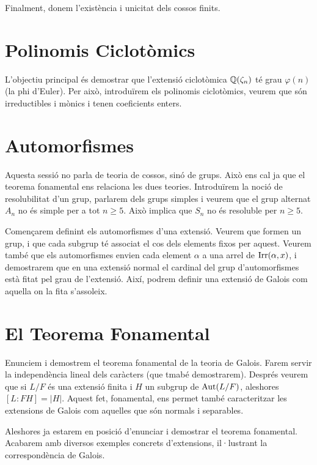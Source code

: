 \documentclass[
]{book}
\theoremstyle{definition}
\theoremstyle{definition}
\theoremstyle{definition}
\theoremstyle{definition}
\theoremstyle{remark}
\begin{document}
Finalment, donem l'existència i unicitat dels cossos finits.

\hypertarget{polinomis-ciclotuxf2mics}{%
\chapter{Polinomis Ciclotòmics}\label{polinomis-ciclotuxf2mics}}

L'objectiu principal és demostrar que l'extensió ciclotòmica \(\mathbb{Q}(\zeta_n)\) té grau \(\varphi(n)\) (la phi d'Euler). Per això,
introduïrem els polinomis ciclotòmics, veurem que són irreductibles i mònics i tenen coeficients enters.

\hypertarget{automorfismes}{%
\chapter{Automorfismes}\label{automorfismes}}

Aquesta sessió no parla de teoria de cossos, sinó de grups. Això ens cal ja que el teorema fonamental ens relaciona les dues teories. Introduïrem
la noció de resolubilitat d'un grup, parlarem dels grups simples i veurem que el grup alternat \(A_n\) no és simple per a tot \(n \geq 5\). Això
implica que \(S_n\) no és resoluble per \(n\geq 5\).

Començarem definint els automorfismes d'una extensió. Veurem que formen
un grup, i que cada subgrup té associat el cos dels elements fixos per aquest. Veurem també
que els automorfismes envien cada element \(\alpha\) a una arrel de \(\operatorname{Irr}(\alpha,x)\),
i demostrarem que en una extensió normal el cardinal del grup d'automorfismes està
fitat pel grau de l'extensió. Així, podrem definir una extensió de Galois com aquella
on la fita s'assoleix.

\hypertarget{el-teorema-fonamental}{%
\chapter{El Teorema Fonamental}\label{el-teorema-fonamental}}

Enunciem i demostrem el teorema fonamental de la teoria de Galois. Farem
servir la independència lineal dels caràcters (que tmabé demostrarem). Després veurem
que si \(L / F\) és una extensió finita i \(H\) un subgrup de \(\operatorname{Aut}(L/F)\), aleshores
\([L \colon FH] = |H|\). Aquest fet, fonamental, ens permet també caracteritzar
les extensions de Galois com aquelles que són normals i separables.

Aleshores ja estarem en posició d'enunciar i demostrar el teorema fonamental. Acabarem
amb diversos exemples concrets d'extensions, il·lustrant la correspondència de Galois.
\end{document}
